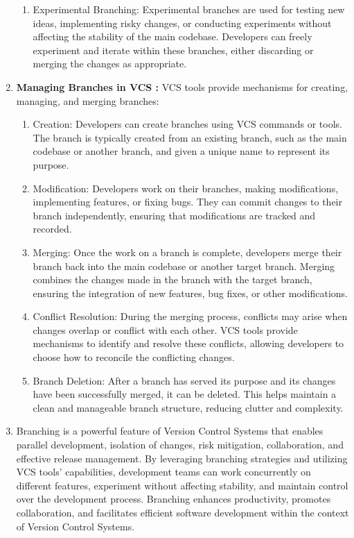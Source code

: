 \begin{enumerate}
\begin{enumerate}
        \item Experimental Branching: Experimental branches are used for testing new ideas, implementing risky changes, or conducting experiments without affecting the stability of the main codebase. Developers can freely experiment and iterate within these branches, either discarding or merging the changes as appropriate.
    \end{enumerate}
    \item \textbf{Managing Branches in VCS : }VCS tools provide mechanisms for creating, managing, and merging branches:
    \begin{enumerate}
        \item Creation: Developers can create branches using VCS commands or tools. The branch is typically created from an existing branch, such as the main codebase or another branch, and given a unique name to represent its purpose.

        \item Modification: Developers work on their branches, making modifications, implementing features, or fixing bugs. They can commit changes to their branch independently, ensuring that modifications are tracked and recorded.

        \item Merging: Once the work on a branch is complete, developers merge their branch back into the main codebase or another target branch. Merging combines the changes made in the branch with the target branch, ensuring the integration of new features, bug fixes, or other modifications.

        \item Conflict Resolution: During the merging process, conflicts may arise when changes overlap or conflict with each other. VCS tools provide mechanisms to identify and resolve these conflicts, allowing developers to choose how to reconcile the conflicting changes.

        \item Branch Deletion: After a branch has served its purpose and its changes have been successfully merged, it can be deleted. This helps maintain a clean and manageable branch structure, reducing clutter and complexity.
    \end{enumerate}
    \item Branching is a powerful feature of Version Control Systems that enables parallel development, isolation of changes, risk mitigation, collaboration, and effective release management. By leveraging branching strategies and utilizing VCS tools' capabilities, development teams can work concurrently on different features, experiment without affecting stability, and maintain control over the development process. Branching enhances productivity, promotes collaboration, and facilitates efficient software development within the context of Version Control Systems.
\end{enumerate}